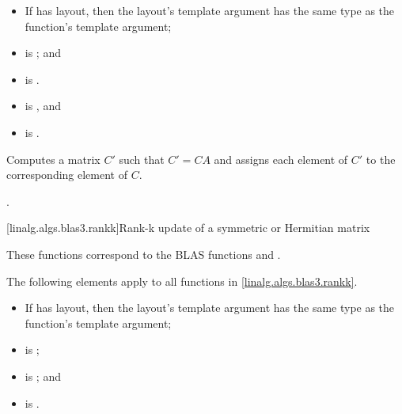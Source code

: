 \begin{itemdescr}
\pnum
\mandates
\begin{itemize}
\item
If  has  layout,
then the layout's  template argument has
the same type as the function's  template argument;
\item
{}
is ; and
\item
{} is .
\end{itemize}

\pnum
\expects
\begin{itemize}
\item
{} is , and
\item
{} is .
\end{itemize}

\pnum
\effects
Computes a matrix $C'$ such that $C' = C A$ and
assigns each element of $C'$ to the corresponding element of $C$.

\pnum
\complexity
{}.
\end{itemdescr}

[linalg.algs.blas3.rankk]{Rank-k update of a symmetric or Hermitian matrix}

\pnum
\begin{note}
These functions correspond to the BLAS functions
 and .
\end{note}

\pnum
The following elements apply to all functions in \ref{linalg.algs.blas3.rankk}.

\pnum
\mandates
\begin{itemize}
\item
If  has  layout,
then the layout's  template argument has
the same type as the function's  template argument;
\item
{}
is ;
\item
{}
is ; and
\item
{}
is .
\end{itemize}

